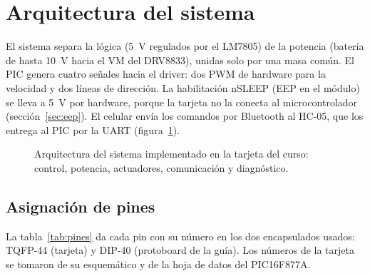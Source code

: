 \section{Arquitectura del sistema}
\label{sec:arquitectura}

El sistema separa la lógica (\SI{5}{\volt} regulados por el LM7805) de la
potencia (batería de hasta \SI{10}{\volt} hacia el VM del DRV8833), unidas solo
por una masa común. El PIC genera cuatro señales hacia el driver: dos PWM de
hardware para la velocidad y dos líneas de dirección. La habilitación nSLEEP
(EEP en el módulo) se lleva a \SI{5}{\volt} por hardware, porque la tarjeta no
la conecta al microcontrolador (sección~\ref{sec:eep}). El celular envía los
comandos por Bluetooth al HC-05, que los entrega al PIC por la UART
(figura~\ref{fig:arquitectura}).

\begin{figure}[H]
  \centering
  \resizebox{\textwidth}{!}{}
  \caption{Arquitectura del sistema implementado en la tarjeta del curso:
           control, potencia, actuadores, comunicación y diagnóstico.}
  \label{fig:arquitectura}
\end{figure}

\subsection{Asignación de pines}

La tabla~\ref{tab:pines} da cada pin con su número en los dos encapsulados
usados: TQFP-44 (tarjeta) y DIP-40 (protoboard de la guía). Los números de la
tarjeta se tomaron de su esquemático y de la hoja de datos del PIC16F877A.

